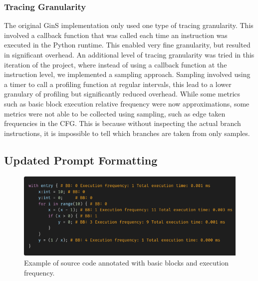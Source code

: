 \documentclass[sigconf,nonacm]{acmart}
\begin{document}
\subsubsection{Tracing Granularity}
The original GinS implementation only used one type of tracing granularity.
This involved a callback function that was called each time an instruction was executed in the Python runtime.
This enabled very fine granularity, but resulted in significant overhead.
An additional level of tracing granularity was tried in this iteration of the project, where instead of using a callback function at the instruction level,
we implemented a sampling approach. Sampling involved using a timer to call a profiling function at regular intervals, this lead to a lower granulary of profiling
but significantly reduced overhead. While some metrics such as basic block execution relative frequency were now approximations, some metrics were not able
to be collected using sampling, such as edge taken frequencies in the CFG. This is because without inspecting the actual branch instructions, it is impossible to tell
which branches are taken from only samples.
\subsection{Updated Prompt Formatting}

\begin{figure}
    \centering
    \includegraphics[width=1\linewidth]{images/Picture2.png}
    \caption{Example of source code annotated with basic blocks and execution frequency.}
    \label{fig:annotations}
\end{figure}
\end{document}
